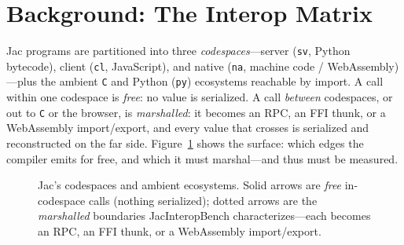 \documentclass[conference]{IEEEtran}
\newcommand{\code}[1]{\texttt{#1}}
\begin{document}
\section{Background: The Interop Matrix}
\label{sec:matrix}

Jac programs are partitioned into three \emph{codespaces}---server (\code{sv},
Python bytecode), client (\code{cl}, JavaScript), and native (\code{na}, machine
code / WebAssembly)---plus the ambient \code{C} and Python (\code{py})
ecosystems reachable by import. A call within one codespace is \emph{free}: no
value is serialized. A call \emph{between} codespaces, or out to \code{C} or the
browser, is \emph{marshalled}: it becomes an RPC, an FFI thunk, or a WebAssembly
import/export, and every value that crosses is serialized and reconstructed on
the far side. Figure~\ref{fig:overview} shows the surface: which edges the
compiler emits for free, and which it must marshal---and thus must be measured.

\begin{figure}[t]
\centering
{}
\caption{Jac's codespaces and ambient ecosystems. Solid arrows are
\emph{free} in-codespace calls (nothing serialized); dotted arrows are the
\emph{marshalled} boundaries JacInteropBench characterizes---each becomes an
RPC, an FFI thunk, or a WebAssembly import/export.}
\label{fig:overview}
\end{figure}
\end{document}
